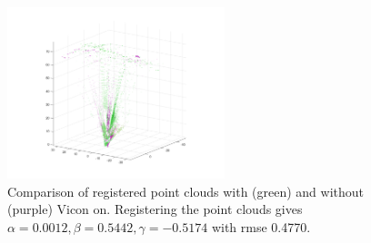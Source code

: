 \documentclass[12pt,a4paper]{article}
\begin{document}
	\begin{figure}[h]
		\centering
		\includegraphics[height=50mm, trim = 20mm 20mm 20mm 20mm, clip]{full_compare.png}
		\caption{Comparison of registered point clouds with (green) and without (purple) Vicon on. Registering the point clouds gives $\alpha = 0.0012, \beta = 0.5442, \gamma = -0.5174$ with rmse 0.4770.}
		\label{f: vicon all frame}
	\end{figure}

\newpage
\end{document}

